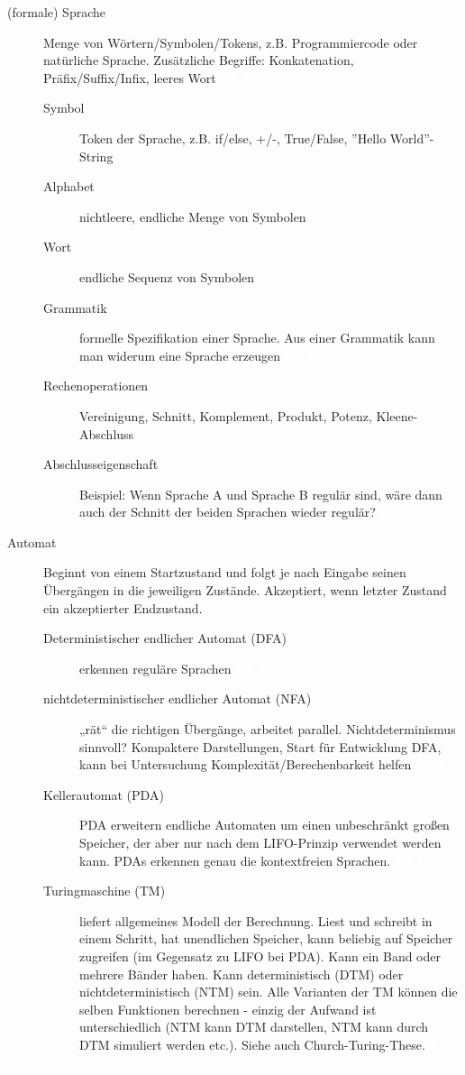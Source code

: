 \documentclass[a4paper,10pt]{article}
\newcommand{\vl}[1]{\colorbox{vl}{\textcolor{white}{\small\textbf{#1}}}}
\begin{document}
    \begin{description}
        \item[(formale) Sprache] Menge von Wörtern/Symbolen/Tokens, z.B. Programmiercode oder natürliche Sprache.
            Zusätzliche Begriffe: Konkatenation, Präfix/Suffix/Infix, leeres Wort \vl{FS 1}
            \begin{description}
                \item[Symbol] Token der Sprache, z.B. if/else, +/-, True/False, ''Hello World''-String
                \item[Alphabet] nichtleere, endliche Menge von Symbolen
                \item[Wort] endliche Sequenz von Symbolen
                \item[Grammatik] formelle Spezifikation einer Sprache. Aus einer Grammatik kann man widerum eine Sprache erzeugen \vl{FS 2}
                \item[Rechenoperationen] Vereinigung, Schnitt, Komplement, Produkt, Potenz, Kleene-Abschluss
                \item[Abschlusseigenschaft] Beispiel: Wenn Sprache A und Sprache B regulär sind, wäre dann auch der Schnitt der beiden Sprachen wieder regulär? \vl{FS 5}
            \end{description}

        \item[Automat]
            Beginnt von einem Startzustand und folgt je nach Eingabe seinen Übergängen in die jeweiligen Zustände.
            Akzeptiert, wenn letzter Zustand ein akzeptierter Endzustand.
            \begin{description}
                \item[Deterministischer endlicher Automat (DFA)] erkennen reguläre Sprachen \vl{FS 3}
                \item[nichtdeterministischer endlicher Automat (NFA)] „rät“ die richtigen Übergänge, arbeitet parallel. Nichtdeterminismus sinnvoll? Kompaktere Darstellungen, Start für Entwicklung DFA, kann bei Untersuchung Komplexität/Berechenbarkeit helfen \vl{FS 4}
                \item[Kellerautomat (PDA)]
                    PDA erweitern endliche Automaten um einen unbeschränkt großen Speicher, der aber nur nach dem LIFO-Prinzip verwendet werden
                    kann. PDAs erkennen genau die kontextfreien Sprachen. \vl{FS 15}
                \item[Turingmaschine (TM)]
                    liefert allgemeines Modell der Berechnung. Liest und schreibt in einem Schritt, hat unendlichen
                    Speicher, kann beliebig auf Speicher zugreifen (im Gegensatz zu LIFO bei PDA).
                    Kann ein Band oder mehrere Bänder haben.
                    Kann deterministisch (DTM) oder nichtdeterministisch (NTM) sein.
                    Alle Varianten der TM können die selben Funktionen berechnen - einzig der Aufwand ist unterschiedlich (NTM kann DTM darstellen, NTM kann durch DTM simuliert werden etc.).
                    Siehe auch Church-Turing-These. \vl{FS 18}
            \end{description}



\end{description}
\end{document}
